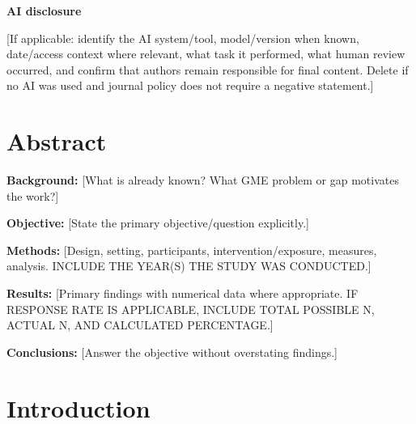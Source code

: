 \documentclass[12pt]{article}
\begin{document}
\vspace{1em}

\textbf{AI disclosure}

[If applicable: identify the AI system/tool, model/version when known,
	date/access context where relevant, what task it performed, what human review
	occurred, and confirm that authors remain responsible for final content.
	Delete if no AI was used and journal policy does not require a negative
	statement.]

\clearpage


%
%

\section*{Abstract}

\textbf{Background:}
[What is already known? What GME problem or gap motivates the work?]

\textbf{Objective:}
[State the primary objective/question explicitly.]

\textbf{Methods:}
[Design, setting, participants, intervention/exposure, measures, analysis.
	INCLUDE THE YEAR(S) THE STUDY WAS CONDUCTED.]

\textbf{Results:}
[Primary findings with numerical data where appropriate. IF RESPONSE RATE IS
	APPLICABLE, INCLUDE TOTAL POSSIBLE N, ACTUAL N, AND CALCULATED PERCENTAGE.]

\textbf{Conclusions:}
[Answer the objective without overstating findings.]

\clearpage

%

\section{Introduction}
\end{document}

